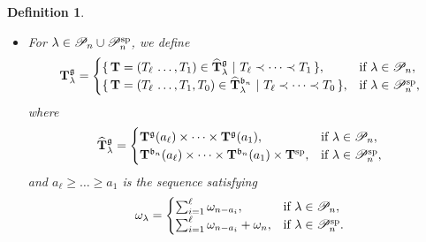 \documentclass[leqno,11pt]{amsart}
\newtheorem{df}[thm]{\bf Definition}
\numberwithin{equation}{section}
\newcommand{\cP}{\mathscr{P}}
\newcommand{\mf}{\mathfrak}
\newcommand{\la}{\lambda}
\begin{document}
\begin{df}
{\begin{itemize}
\item[(2)] For $\la\in \cP_n\cup\cP_n^{\rm sp}$, 
we define
\begin{equation*}
{\bf T}^{\mf g}_{\la}=
\begin{cases}
\{\,{\bf T}=(T_\ell\,\ldots,T_1)\in \widehat{\bf T}^{\mf g}_{\la}\ |\ \text{$T_{\ell}\prec \cdots \prec T_{1}$}\,\},& \text{if $\la\in\cP_n$},\\
\{\,{\bf T}=(T_\ell\,\ldots, T_1,T_0)\in \widehat{\bf T}^{\mf b_n}_{\la}\ |\ \text{$T_{\ell}\prec \cdots \prec T_{0}$}\,\},& \text{if $\la\in\cP_n^{\rm sp}$},\\
\end{cases}
\end{equation*}
where 
\begin{equation*}
\widehat{\bf T}^{\mf g}_{\la}=
\begin{cases}
{\bf T}^{\mf g}(a_\ell)\times \cdots \times {\bf T}^{\mf g}(a_1), & \text{if $\la\in\cP_n$}, \\
{\bf T}^{\mf b_n}(a_\ell)\times \cdots \times {\bf T}^{\mf b_n}(a_1)\times {\bf T}^{\rm sp}, & \text{if $\la\in\cP_n^{\rm sp}$}, \\
\end{cases}
\end{equation*}
and $a_\ell\geq \ldots \geq a_1$ is the sequence satisfying 
\begin{equation*}
\omega_\la=
\begin{cases}
\sum_{i=1}^\ell\omega_{n-a_i}, & \text{if $\la\in\cP_n$}, \\
\sum_{i=1}^\ell\omega_{n-a_i}+\omega_n, & \text{if $\la\in\cP_n^{\rm sp}$}. \\
\end{cases}
\end{equation*}
\end{itemize}
}
\end{df}
\end{document}
